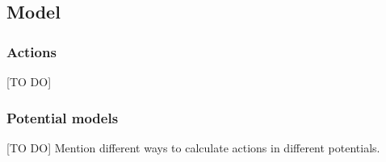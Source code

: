 \subsection{Model}

\subsubsection{Actions}

[TO DO]

\subsubsection{Potential models}  \label{sec:potentials}

[TO DO] Mention different ways to calculate actions in different potentials.


